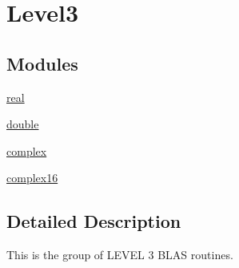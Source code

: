 \hypertarget{group__level3}{}\section{Level3}
\label{group__level3}
\subsection*{Modules}
\begin{DoxyCompactItemize}
\item 
\hyperlink{group__single__blas__level3}{real}
\item 
\hyperlink{group__double__blas__level3}{double}
\item 
\hyperlink{group__complex__blas__level3}{complex}
\item 
\hyperlink{group__complex16__blas__level3}{complex16}
\end{DoxyCompactItemize}


\subsection{Detailed Description}
This is the group of L\+E\+V\+E\+L 3 B\+L\+A\+S routines. 